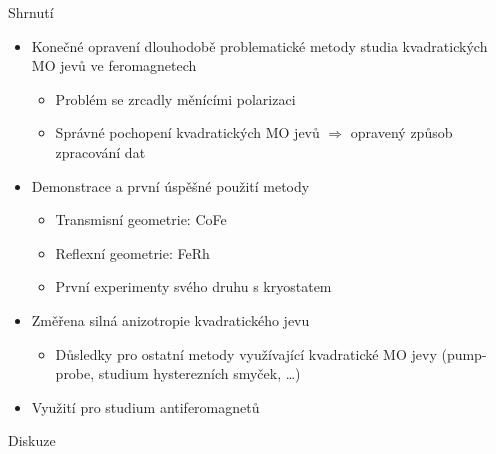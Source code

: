 \documentclass{beamer}
\begin{document}
\begin{frame}{Shrnutí}
    \begin{itemize}
        \item Konečné opravení dlouhodobě problematické metody studia kvadratických MO jevů ve feromagnetech
            \begin{itemize}
                \item Problém se zrcadly měnícími polarizaci
                \item Správné pochopení kvadratických MO jevů $\Rightarrow$ opravený způsob zpracování dat
            \end{itemize}
        \item Demonstrace a první úspěšné použití metody
            \begin{itemize}
                \item Transmisní geometrie: CoFe
                \item Reflexní geometrie: FeRh
                \item První experimenty svého druhu s kryostatem
            \end{itemize}
        \item Změřena silná anizotropie kvadratického jevu
            \begin{itemize}
                \item Důsledky pro ostatní metody využívající kvadratické MO jevy (pump-probe, studium hysterezních smyček, \ldots)
            \end{itemize}
        \item Využití pro studium antiferomagnetů
    \end{itemize}
\end{frame}


\begin{frame}
\centering \huge Diskuze 
\end{frame}
\end{document}
